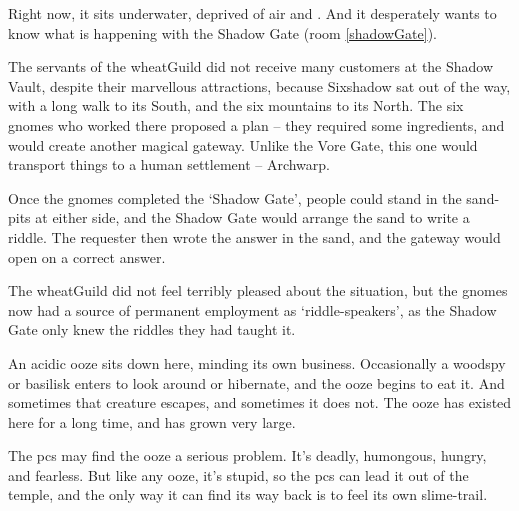 \begin{multicols}{2}
Right now, it sits underwater, deprived of air and .
And it desperately wants to know what is happening with the Shadow Gate (room \vref{shadowGate}).



\begin{exampletext}
  The servants of the \gls{wheatGuild} did not receive many customers at the Shadow Vault, despite their marvellous attractions, because Sixshadow sat out of the way, with a long walk to its South, and the six mountains to its North.
  The six gnomes who worked there proposed a plan -- they required some \glspl{ingredient}, and would create another magical gateway.
  Unlike the Vore Gate, this one would transport things to a human settlement -- Archwarp.

  Once the gnomes completed the `Shadow Gate', people could stand in the sand-pits at either side, and the Shadow Gate would arrange the sand to write a riddle.
  The requester then wrote the answer in the sand, and the gateway would open on a correct answer.

  The \gls{wheatGuild} did not feel terribly pleased about the situation, but the gnomes now had a source of permanent employment as `riddle-speakers', as the Shadow Gate only knew the riddles they had taught it.
\end{exampletext}

An acidic ooze sits down here, minding its own business.
Occasionally a woodspy or basilisk enters to look around or hibernate, and the ooze begins to eat it.
And sometimes that creature escapes, and sometimes it does not.
The ooze has existed here for a long time, and has grown very large.

\uncommonlyLargeJelly

The \glspl{pc} may find the ooze a serious problem.
It's deadly, humongous, hungry, and fearless.
But like any ooze, it's stupid, so the \glspl{pc} can lead it out of the temple, and the only way it can find its way back is to feel its own slime-trail.



\end{multicols}

